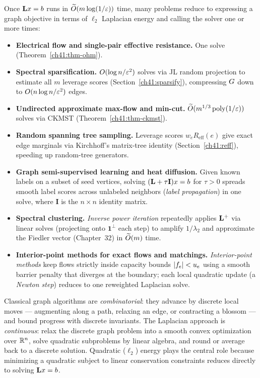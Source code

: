Once $\mathbf{L} x=b$ runs in $\widetilde{O}(m\log(1/\varepsilon))$ time, many problems reduce to expressing a graph objective in terms of $\ell_2$ Laplacian energy and calling the solver one or more times:

\begin{itemize}
  \item \textbf{Electrical flow and single-pair effective resistance.} One solve (Theorem~\ref{ch41:thm-ohm}).
  \item \textbf{Spectral sparsification.} $O(\log n/\varepsilon^2)$ solves via JL random projection to estimate all $m$ leverage scores (Section~\ref{ch41:sparsify}), compressing $G$ down to $O(n\log n/\varepsilon^2)$ edges.
  \item \textbf{Undirected approximate max-flow and min-cut.} $\widetilde{O}(m^{1/3}\operatorname{poly}(1/\varepsilon))$ solves via CKMST (Theorem~\ref{ch41:thm-ckmst}).
  \item \textbf{Random spanning tree sampling.} Leverage scores $w_e R_{\mathrm{eff}}(e)$ give exact edge marginals via Kirchhoff's matrix-tree identity (Section~\ref{ch41:reff}), speeding up random-tree generators.
  \item \textbf{Graph semi-supervised learning and heat diffusion.} Given known labels on a subset of seed vertices, solving $(\mathbf{L}+\tau\mathbf{I})x=b$ for $\tau>0$ spreads smooth label scores across unlabeled neighbors (\emph{label propagation}) in one solve, where $\mathbf{I}$ is the $n\times n$ identity matrix.
  \item \textbf{Spectral clustering.} \emph{Inverse power iteration} repeatedly applies $\mathbf{L}^{+}$ via linear solves (projecting onto $\mathbf{1}^\perp$ each step) to amplify $1/\lambda_2$ and approximate the Fiedler vector (Chapter~32) in $\widetilde{O}(m)$ time.
  \item \textbf{Interior-point methods for exact flows and matchings.} \emph{Interior-point methods} keep flows strictly inside capacity bounds $\lvert f_e\rvert < u_e$ using a smooth barrier penalty that diverges at the boundary; each local quadratic update (a \emph{Newton step}) reduces to one reweighted Laplacian solve.
\end{itemize}

\begin{aestheticbox}
Classical graph algorithms are \emph{combinatorial}: they advance by discrete local moves --- augmenting along a path, relaxing an edge, or contracting a blossom --- and bound progress with discrete invariants. The Laplacian approach is \emph{continuous}: relax the discrete graph problem into a smooth convex optimization over $\mathbb{R}^n$, solve quadratic subproblems by linear algebra, and round or average back to a discrete solution. Quadratic ($\ell_2$) energy plays the central role because minimizing a quadratic subject to linear conservation constraints reduces directly to solving $\mathbf{L} x = b$.
\end{aestheticbox}

